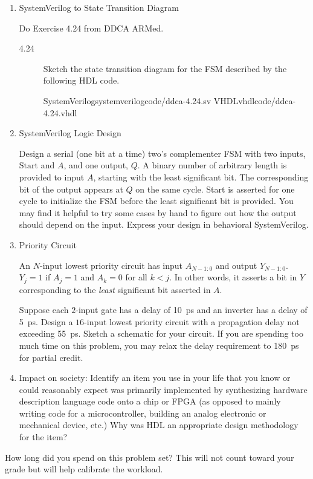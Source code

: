\documentclass{ps}
\date{2019}
\author{}
\begin{document}
\begin{enumerate}
\item SystemVerilog to State Transition Diagram

  Do Exercise 4.24 from DDCA ARMed.

  \begin{description}
  \item[4.24] Sketch the state transition diagram for the FSM
    described by the following HDL code.
    \begin{center}
      \twocolumnlisting
      {SystemVerilog}{systemverilog}{code/ddca-4.24.sv}
      {VHDL}{vhdl}{code/ddca-4.24.vhdl}
    \end{center}
    \begin{solution}
    \end{solution}
  \end{description}

\item SystemVerilog Logic Design

  Design a serial (one bit at a time) two's complementer FSM with two
  inputs, \(\mathrm{Start}\) and \(A\), and one output, \(Q\).  A
  binary number of arbitrary length is provided to input \(A\),
  starting with the least significant bit.  The corresponding bit of
  the output appears at \(Q\) on the same cycle.  Start is asserted
  for one cycle to initialize the FSM before the least significant bit
  is provided.  You may find it helpful to try some cases by hand to
  figure out how the output should depend on the input.  Express your
  design in behavioral SystemVerilog.
  \begin{solution}
  \end{solution}

\item Priority Circuit

  An \(N\)-input lowest priority circuit has input \(A_{N-1:0}\) and
  output \(Y_{N-1:0}\).  \(Y_j = 1\) if \(A_j = 1\) and \(A_k = 0\)
  for all \(k<j\).  In other words, it asserts a bit in \(Y\)
  corresponding to the \emph{least} significant bit asserted in \(A\).

  Suppose each \(2\)-input gate has a delay of \SI{10}{\ps} and an
  inverter has a delay of \SI{5}{\ps}.  Design a \(16\)-input lowest
  priority circuit with a propagation delay not exceeding
  \SI{55}{\ps}.  Sketch a schematic for your circuit.  If you are
  spending too much time on this problem, you may relax the delay
  requirement to \SI{180}{\ps} for partial credit.
  \begin{solution}
  \end{solution}

\item Impact on society: Identify an item you use in your life that
  you know or could reasonably expect was primarily implemented by
  synthesizing hardware description language code onto a chip or FPGA
  (as opposed to mainly writing code for a microcontroller, building
  an analog electronic or mechanical device, etc.)  Why was HDL an
  appropriate design methodology for the item?
  \begin{solution}
  \end{solution}
\end{enumerate}

How long did you spend on this problem set?  This will not count
toward your grade but will help calibrate the workload.
\begin{solution}
\end{solution}
\end{document}
